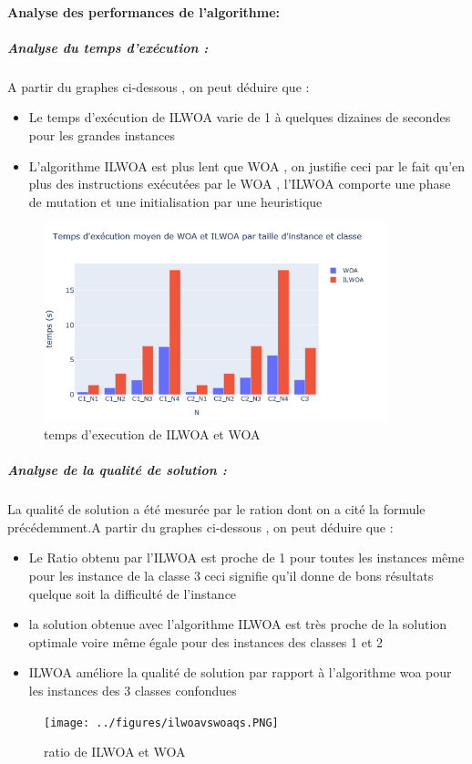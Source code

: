 \documentclass[12pt]{article}
\begin{document}
\paragraph{Analyse des performances de l'algorithme: }
\subparagraph{Analyse du temps d'exécution :}
A partir du graphes ci-dessous , on peut déduire que :
\begin{itemize}
    \item Le temps d'exécution de ILWOA varie de 1  à quelques dizaines de secondes pour les grandes instances 
    \item L’algorithme ILWOA est plus lent que WOA , on justifie ceci par le fait qu’en plus des instructions exécutées par le WOA , l’ILWOA comporte une phase de mutation et une initialisation par une heuristique  
\end{itemize}
\begin{figure}[h!]
    \centering
     \includegraphics[width=10cm]{../figures/woavsilwoatemps.PNG}
     \caption[\small]{temps d'execution de ILWOA et WOA}
 \end{figure}
 \subparagraph{Analyse de la qualité de solution :}
La qualité de solution a été mesurée par le ration dont on a cité la formule précédemment.A partir du graphes ci-dessous , on peut déduire que :
 \begin{itemize}
     \item Le Ratio obtenu par l’ILWOA est proche de 1 pour toutes les instances même pour les instance de la classe 3 ceci signifie qu’il donne de bons résultats quelque soit la difficulté de l’instance 
     \item la solution obtenue avec l’algorithme ILWOA est très proche de la solution optimale voire même égale pour des instances des classes 1 et 2 
     \item ILWOA améliore la qualité de solution par rapport à l’algorithme woa pour les instances des 3 classes confondues
 \end{itemize}
 \begin{figure}[h!]
     \centering
      \texttt{[image: ../figures/ilwoavswoaqs.PNG]}
      \caption[\small]{ratio de ILWOA et WOA}
  \end{figure}
\end{document}
